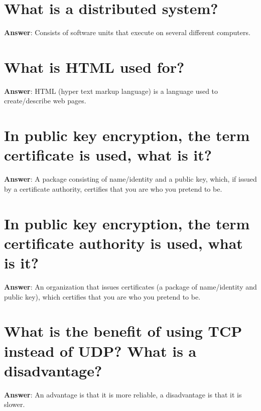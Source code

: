 \documentclass[a4paper,11pt,oneside]{book}
\begin{document}
\begin{sloppypar}
\section{What is a distributed system?}

\label{q:159:sa:en:True}

\textbf{Answer}: Consists of software units that execute on several different computers.



\section{What is HTML used for?}

\label{q:160:sa:en:True}

\textbf{Answer}: HTML (hyper text markup language) is a language used to create/describe web pages.



\section{In public key encryption, the term certificate is used, what is it?}

\label{q:161:sa:en:True}

\textbf{Answer}: A package consisting of name/identity and a public key, which, if issued by a certificate authority, certifies that you are who you pretend to be.



\section{In public key encryption, the term certificate authority is used, what is it?}

\label{q:162:sa:en:True}

\textbf{Answer}: An organization that issues certificates (a package of name/identity and public key), which certifies that you are who you pretend to be.



\section{What is the benefit of using TCP instead of UDP? What is a disadvantage?}

\label{q:163:sa:en:True}

\textbf{Answer}: An advantage is that it is more reliable, a disadvantage is that it is slower.




\end{sloppypar}
\end{document}
